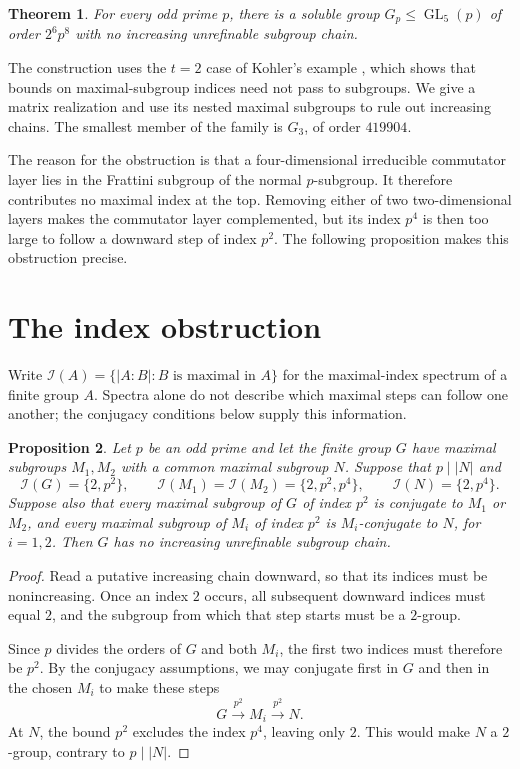 \documentclass[11pt]{amsart}
\newtheorem{theorem}{Theorem}
\newtheorem{proposition}[theorem]{Proposition}
\newcommand{\I}{\mathcal I}
\begin{document}
\begin{theorem}\label{thm:main}
For every odd prime $p$, there is a soluble group
$G_p\leq\operatorname{GL}_5(p)$ of order $2^6p^8$ with no increasing
unrefinable subgroup chain.
\end{theorem}

The construction uses the $t=2$ case of Kohler's example
\cite[Section~4, Theorem~4.1]{Kohler1964}, which shows that bounds on
maximal-subgroup indices need not pass to subgroups. We give a matrix
realization and use its nested maximal subgroups to rule out increasing
chains. The smallest member of the family is $G_3$, of order $419904$.

The reason for the obstruction is that a four-dimensional irreducible
commutator layer lies in the Frattini subgroup of the normal $p$-subgroup.
It therefore contributes no maximal index at the top. Removing either of
two two-dimensional layers makes the commutator layer complemented, but its
index $p^4$ is then too large to follow a downward step of index $p^2$.
The following proposition makes this obstruction precise.

\section{The index obstruction}

Write $\I(A)=\{\lvert A:B\rvert:B\text{ is maximal in }A\}$ for the
maximal-index spectrum of a finite group $A$. Spectra alone do not describe
which maximal steps can follow one another; the conjugacy conditions below
supply this information.

\begin{proposition}\label{prop:trap}
Let $p$ be an odd prime and let the finite group $G$ have maximal subgroups
$M_1,M_2$ with a common maximal subgroup $N$. Suppose that
$p\mid\lvert N\rvert$ and
\[
 \I(G)=\{2,p^2\},\qquad
 \I(M_1)=\I(M_2)=\{2,p^2,p^4\},\qquad
 \I(N)=\{2,p^4\}.
\]
Suppose also that every maximal subgroup of $G$ of index $p^2$ is conjugate
to $M_1$ or $M_2$, and every maximal subgroup of $M_i$ of index $p^2$ is
$M_i$-conjugate to $N$, for $i=1,2$. Then $G$ has no increasing
unrefinable subgroup chain.
\end{proposition}

\begin{proof}
Read a putative increasing chain downward, so that its indices must be
nonincreasing. Once an index $2$ occurs, all subsequent downward indices
must equal $2$, and the subgroup from which that step starts must be a
$2$-group.

Since $p$ divides the orders of $G$ and both $M_i$, the first two indices
must therefore be $p^2$. By the conjugacy assumptions, we may conjugate
first in $G$ and then in the chosen $M_i$ to make these steps
\[
 G\xrightarrow{\ p^2\ }M_i\xrightarrow{\ p^2\ }N.
\]
At $N$, the bound $p^2$ excludes the index $p^4$, leaving only $2$.
This would make $N$ a $2$-group, contrary to $p\mid\lvert N\rvert$.
\end{proof}
\end{document}

